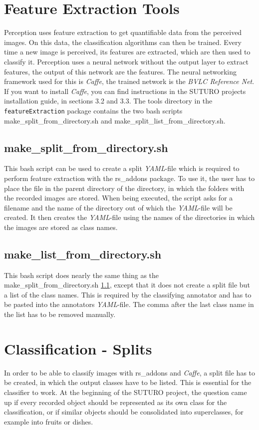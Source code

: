 \documentclass[main.tex]{subfiles}
\begin{document}
\section{Feature Extraction Tools}
Perception uses feature extraction to get quantifiable data from the perceived images. On this data, the classification algorithms can then be trained. Every time a new image is perceived, its features are extracted, which are then used to classify it. Perception uses a neural network without the output layer to extract features, the output of this network are the features. The neural networking framework used for this is \textit{Caffe}, the trained network is the \textit{BVLC Reference Net}. If you want to install \textit{Caffe}, you can find instructions in the SUTURO projects installation guide, in sections 3.2 and 3.3. The tools directory in the \texttt{featureExtraction} package contains the two bash scripts make\_split\_from\_directory.sh and make\_split\_list\_from\_directory.sh.

\subsection{make\_split\_from\_directory.sh} \label{make_split_from_directory}
This bash script can be used to create a split \textit{YAML}-file which is required to perform feature extraction with the rs\_addons package. To use it, the user has to place the file in the parent directory of the directory, in which the folders with the recorded images are stored. When being executed, the script asks for a filename and the name of the directory out of which the \textit{YAML}-file will be created. It then creates the \textit{YAML}-file using the names of the directories in which the images are stored as class names.

\subsection{make\_list\_from\_directory.sh}
This bash script does nearly the same thing as the make\_split\_from\_directory.sh \ref{make_split_from_directory}, except that it does not create a split file but a list of the class names. This is required by the classifying annotator and has to be pasted into the annotators \textit{YAML}-file. The comma after the last class name in the list has to be removed manually.

\section{Classification - Splits}
In order to be able to classify images with rs\_addons and \textit{Caffe}, a split file has to be created, in which the output classes have to be listed. This is essential for the classifier to work. At the beginning of the SUTURO project, the question came up if every recorded object should be represented as its own class for the classification, or if similar objects should be consolidated into superclasses, for example into fruits or dishes.\\
\end{document}
